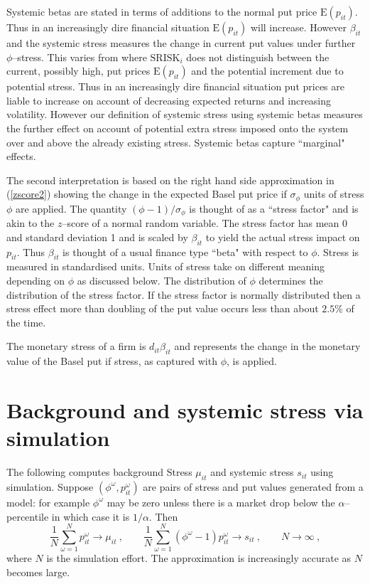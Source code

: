 \documentclass[12pt]{article}
\newcommand{\E}{\mathrm{E}}
\renewcommand{\o}{\omega}
\newcommand{\eref}[1]{(\ref{#1})}
\newcommand{\cq}{\ , \qquad}
\newcommand{\be}[1]{\begin{equation}\label{#1}}
\newcommand{\ee}{\end{equation}}
\begin{document}
Systemic betas are stated in terms of additions to the normal put price $\E(p_{it})$. Thus in an increasingly dire financial situation $\E(p_{it})$ will increase.   However  $\beta_{it}$ and the systemic stress measures the  change in current put values  under  further $\phi$--stress.  This varies from  \cite{brownlees2015} where $\mathrm{SRISK}_i$ does not distinguish between the current, possibly high, put prices $\E(p_{it})$ and the potential  increment due to potential stress.   Thus in an increasingly dire financial situation put prices are liable to increase on account of decreasing expected returns and increasing volatility.   However our definition of systemic stress using systemic betas measures the further effect on account of potential extra stress imposed onto the system over and above the already existing stress.   Systemic betas capture   ``marginal" effects.

The second interpretation is based on  the right hand side approximation in \eref{zscore2} showing   the change in the  expected Basel put price if  $\sigma_\phi$ units of stress $\phi$ are applied.  The quantity $(\phi-1)/\sigma_\phi$ is thought of as a ``stress factor" and is akin to the $z$--score of a normal random variable.  The stress factor has mean 0 and standard deviation 1 and is scaled by $\beta_{it}$ to yield the actual stress impact on  $p_{it}$.  Thus  $\beta_{it}$ is thought of a usual finance type ``beta" with respect to $\phi$.   Stress is measured in standardised units.  Units of stress take on different meaning depending on  $\phi$ as discussed below. The distribution of $\phi$ determines the distribution of the stress factor. If the stress factor is normally distributed then a stress effect more than doubling of the put value  occurs less than about $2.5\%$ of the time.



The  monetary stress of a firm is
$
d_{it}\beta_{it}
$
and represents the change in the monetary value of the Basel put  if stress, as captured with $\phi$, is applied.

\section{Background and systemic stress via simulation}\label{estimate}

The following computes background Stress $\mu_{it}$ and systemic stress $s_{it}$ using simulation.   Suppose $(\phi^\o,p_{it}^\o)$ are pairs of stress and put values generated from a model: for example $\phi^\o$ may be zero unless there is a market drop below the $\alpha$--percentile in which case it is $1/\alpha$.
Then
\be{simulate}
\frac{1}{N}\sum_{\o=1}^N p_{it}^\o\rightarrow \mu_{it}\cq \frac{1}{N}\sum_{\o=1}^N (\phi^\o-1)p_{it}^\o\rightarrow s_{it} \cq N\rightarrow\infty\ ,
\ee
where $N$ is the simulation effort.  The approximation is increasingly accurate as $N$ becomes large.
\end{document}
